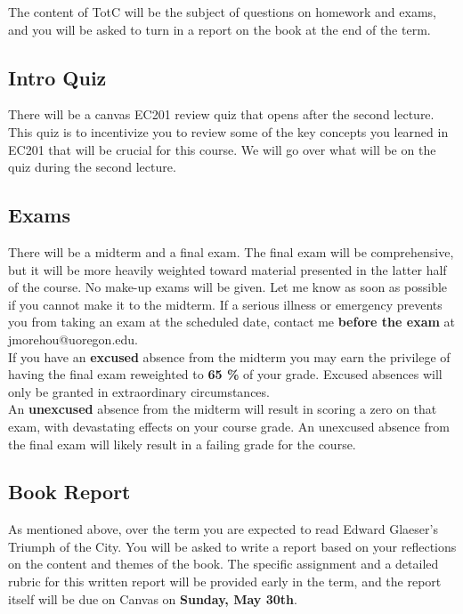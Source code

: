 \documentclass[11pt]{article}
\begin{document}
	
	\noindent The content of TotC will be the subject of questions on homework and exams, and you will be asked to turn in a report on the book at the end of the term. 
	

	

	
	
	\subsection*{Intro Quiz}

		There will be a canvas EC201 review quiz that opens after the second lecture. This quiz is to incentivize you to review some of the key concepts you learned in EC201 that will be crucial for this course. We will go over what will be on the quiz during the second lecture. 
		

	\subsection*{Exams}
	
	There will be a midterm and a final exam. The final exam will be comprehensive, but it will be more heavily weighted toward material presented in the latter half of the course. No make-up exams will be given. Let me know as soon as possible if you cannot make it to the midterm. If a serious illness or emergency prevents you from taking an exam at the scheduled date, contact me \textbf{before the exam} at jmorehou@uoregon.edu.\\
	
	\noindent If you have an \textbf{excused} absence from the midterm you may earn the privilege of having the final exam reweighted to \textbf{65 \%} of your grade.  Excused absences will only be granted in extraordinary circumstances.\\
	
	\noindent An \textbf{unexcused} absence from the midterm will result in scoring a zero on that exam, with devastating effects on your course grade. An unexcused absence from the final exam will likely result in a failing grade for the course.
	
	
	\subsection*{Book Report}
	
		As mentioned above, over the term you are expected to read Edward Glaeser’s Triumph of the City. You will be asked to write a report based on your reflections on the content and themes of the book. The specific assignment and a detailed rubric for this written report will be provided early in the term, and the report itself will be due on Canvas on \textbf{Sunday, May 30th}.
\end{document}

